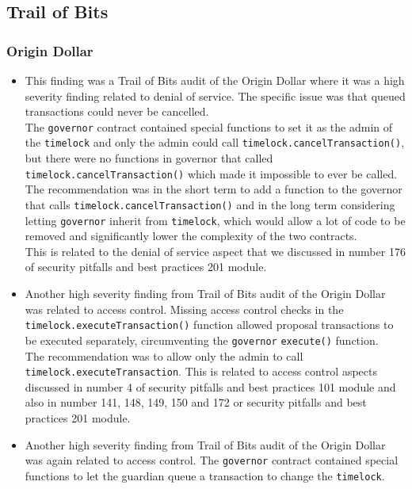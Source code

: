 \subsection{Trail of Bits}\label{trail-of-bits}

\subsubsection{Origin Dollar}\label{origin-dollar}

\begin{itemize}
\item
  This finding was a Trail of Bits audit of the Origin Dollar where it
  was a high severity finding related to denial of service. The specific
  issue was that queued transactions could never be cancelled.\\

  The \texttt{governor} contract contained special functions to set it
  as the admin of the \texttt{timelock} and only the admin could call
  \texttt{timelock.cancelTransaction()}, but there were no functions in
  governor that called \texttt{timelock.cancelTransaction()} which made
  it impossible to ever be called.\\

  The recommendation was in the short term to add a function to the
  governor that calls \texttt{timelock.cancelTransaction()} and in the
  long term considering letting \texttt{governor} inherit from
  \texttt{timelock}, which would allow a lot of code to be removed and
  significantly lower the complexity of the two contracts.\\

  This is related to the denial of service aspect that we discussed in
  number 176 of security pitfalls and best practices 201 module.
\item
  Another high severity finding from Trail of Bits audit of the Origin
  Dollar was related to access control. Missing access control checks in
  the \texttt{timelock.executeTransaction()} function allowed proposal
  transactions to be executed separately, circumventing the
  \texttt{governor} \texttt{execute()} function.\\

  The recommendation was to allow only the admin to call
  \texttt{timelock.executeTransaction}. This is related to access
  control aspects discussed in number 4 of security pitfalls and best
  practices 101 module and also in number 141, 148, 149, 150 and 172 or
  security pitfalls and best practices 201 module.
\item
  Another high severity finding from Trail of Bits audit of the Origin
  Dollar was again related to access control. The \texttt{governor}
  contract contained special functions to let the guardian queue a
  transaction to change the \texttt{timelock}.\\


\end{itemize}

